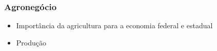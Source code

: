 \documentclass[12pt,aspectratio=169]{beamer}
\begin{document}
\begin{frame}
	\frametitle{Agronegócio}
	\begin{itemize}
		\item Importância da agricultura para a economia federal e estadual
		\item Produção
	\end{itemize}

\begin{figure}%
	\centering
	\qquad
\end{figure}


\end{frame}
\end{document}
